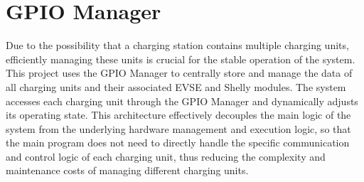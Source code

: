 \documentclass[
	english,
	ruledheaders=section,%
	class=report,%
	thesis={type=Report},%
	accentcolor=9c,%
	custommargins=true,%
	marginpar=false,%
	parskip=half-,%
	fontsize=11pt,%
	logofile={img/tuda_logo.pdf}, %
]{tudapub}
\begin{document}


\section{GPIO Manager}
\label{sec:GPIOManager}

Due to the possibility that a charging station contains multiple charging units, efficiently managing these units is crucial for the stable operation of the system. This project uses the GPIO Manager to centrally store and manage the data of all charging units and their associated EVSE and Shelly modules. The system accesses each charging unit through the GPIO Manager and dynamically adjusts its operating state. This architecture effectively decouples the main logic of the system from the underlying hardware management and execution logic, so that the main program does not need to directly handle the specific communication and control logic of each charging unit, thus reducing the complexity and maintenance costs of managing different charging units. 
\end{document}
